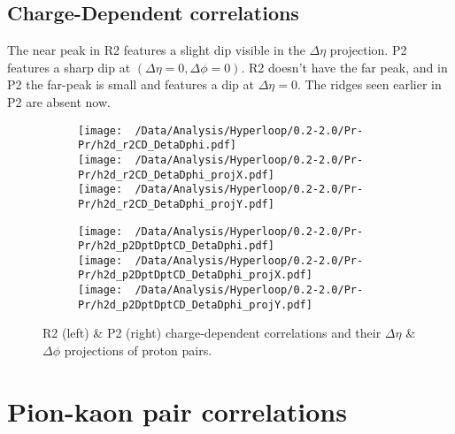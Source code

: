 \documentclass[12pt,a4paper,twoside]{report}
\begin{document}
\subsection{Charge-Dependent correlations}
The near peak in R2 features a slight dip visible in the $\Delta\eta$ projection. P2 features a sharp dip at $(\Delta\eta=0,\Delta\phi=0)$. R2 doesn't have the far peak, and in P2 the far-peak is small and features a dip at $\Delta\eta=0$. The ridges seen earlier in P2 are absent now.
\begin{figure}[H]
	\begin{subfigure}{0.49\linewidth}
		\texttt{[image: ~/Data/Analysis/Hyperloop/0.2-2.0/Pr-Pr/h2d\_r2CD\_DetaDphi.pdf]}\\
		\texttt{[image: ~/Data/Analysis/Hyperloop/0.2-2.0/Pr-Pr/h2d\_r2CD\_DetaDphi\_projX.pdf]}\\
		\texttt{[image: ~/Data/Analysis/Hyperloop/0.2-2.0/Pr-Pr/h2d\_r2CD\_DetaDphi\_projY.pdf]}\\
	\end{subfigure}
	\begin{subfigure}{0.49\linewidth}
		\texttt{[image: ~/Data/Analysis/Hyperloop/0.2-2.0/Pr-Pr/h2d\_p2DptDptCD\_DetaDphi.pdf]}\\
		\texttt{[image: ~/Data/Analysis/Hyperloop/0.2-2.0/Pr-Pr/h2d\_p2DptDptCD\_DetaDphi\_projX.pdf]}\\
		\texttt{[image: ~/Data/Analysis/Hyperloop/0.2-2.0/Pr-Pr/h2d\_p2DptDptCD\_DetaDphi\_projY.pdf]}\\
	\end{subfigure}
	\caption{R2 (left) \& P2 (right) charge-dependent correlations and their $\Delta\eta$ \& $\Delta\phi$ projections of proton pairs.}
\end{figure}
\section{Pion-kaon pair correlations}
\end{document}
